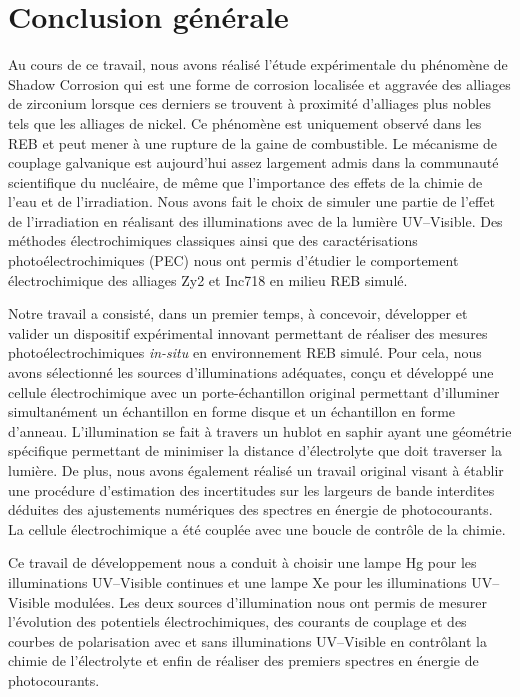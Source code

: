

\chapter*{Conclusion générale}\label{chap:conclusions}
{}

\begin{refsection}


Au cours de ce travail, nous avons réalisé l’étude expérimentale du phénomène de Shadow Corrosion qui est une forme de
corrosion localisée et aggravée des alliages de zirconium lorsque ces derniers se trouvent à proximité d’alliages plus
nobles tels que les alliages de nickel. Ce phénomène est uniquement observé dans les REB et peut mener à une rupture de
la gaine de combustible. Le mécanisme de couplage galvanique est aujourd’hui assez largement admis dans la communauté
scientifique du nucléaire, de même que l’importance des effets de la chimie de l’eau et de l’irradiation. Nous avons
fait le choix de simuler une partie de l’effet de l’irradiation en réalisant des illuminations avec de la lumière
UV--Visible. Des méthodes électrochimiques classiques ainsi que des caractérisations photoélectrochimiques (PEC) nous ont
permis d’étudier le comportement électrochimique des alliages Zy2 et Inc718 en milieu REB simulé.

Notre travail a consisté, dans un premier temps, à concevoir, développer et valider un dispositif expérimental innovant
permettant de réaliser des mesures photoélectrochimiques \emph{in-situ} en environnement REB simulé. Pour cela, nous avons
sélectionné les sources d’illuminations adéquates, conçu et développé une cellule électrochimique avec un
porte-échantillon original permettant d’illuminer simultanément un échantillon en forme disque et un échantillon en
forme d’anneau. L’illumination se fait à travers un hublot en saphir ayant une géométrie spécifique permettant de
minimiser la distance d’électrolyte que doit traverser la lumière. De plus, nous avons également réalisé un travail
original visant à établir une procédure d’estimation des incertitudes sur les largeurs de bande interdites déduites des
ajustements numériques des spectres en énergie de photocourants. La cellule électrochimique a été couplée avec une
boucle de contrôle de la chimie.

Ce travail de développement nous a conduit à choisir une lampe Hg pour les illuminations UV--Visible continues et une
lampe Xe pour les illuminations UV--Visible modulées. Les deux sources d’illumination nous ont permis de mesurer
l’évolution des potentiels électrochimiques, des courants de couplage et des courbes de polarisation avec et sans
illuminations UV--Visible en contrôlant la chimie de l’électrolyte et enfin de réaliser des premiers spectres en énergie
de photocourants.


\end{refsection}
